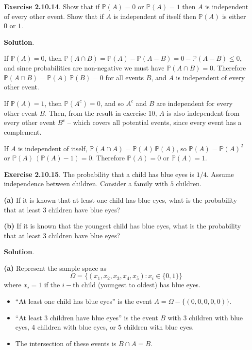 \textbf{Exercise 2.10.14}. Show that if \(\mathbb{P}(A) = 0\) or \(\mathbb{P}(A) = 1\) then \(A\) is independent of every other event. Show that if \(A\) is independent of itself then \(\mathbb{P}(A)\) is either $0$ or $1$.

\textbf{Solution}.

If \(\mathbb{P}(A) = 0\), then \(\mathbb{P}(A \cap B) = \mathbb{P}(A) - \mathbb{P}(A - B) = 0 -\mathbb{P}(A - B) \leq 0\), and since probabilities are non-negative we must have \(\mathbb{P}(A \cap B) = 0\). Therefore \(\mathbb{P}(A \cap B) = \mathbb{P}(A) \, \mathbb{P}(B) = 0\) for all events \(B\), and \(A\) is independent of every other event.

If \(\mathbb{P}(A) = 1\), then \(\mathbb{P}(A^{c}) = 0\), and so \(A^{c}\) and \(B\) are independent for every other event \(B\). Then, from the result in exercise 10, \(A\) is also independent from every other event \(B^{c}\) -- which covers all potential events, since every event has a complement.

If \(A\) is independent of itself, \(\mathbb{P}(A \cap A) = \mathbb{P}(A) \, \mathbb{P}(A)\), so \(\mathbb{P}(A) = \mathbb{P}(A)^{2}\) or \(\mathbb{P}(A) \, ( \mathbb{P}(A) - 1 ) = 0\). Therefore \(\mathbb{P}(A) = 0\) or \(\mathbb{P}(A) = 1\).

\textbf{Exercise 2.10.15}. The probability that a child has blue eyes is $1/4$. Assume independence between children. Consider a family with $5$ children.

\textbf{(a)} If it is known that at least one child has blue eyes, what is the probability that at least $3$ children have blue eyes?

\textbf{(b)} If it is known that the youngest child has blue eyes, what is the probability that at least $3$ children have blue eyes?

\textbf{Solution}.

\textbf{(a)} Represent the sample space as
\[ 
\Omega = \{ (x_{1}, x_{2}, x_{3}, x_{4}, x_{5}) : x_{i} \in \{ 0, 1 \} \} 
\]
where \(x_{i} = 1\) if the \(i-\)th child (youngest to oldest) has blue
eyes.

\begin{itemize}[tightlist]
\item
  ``At least one child has blue eyes'' is the event
  \(A = \Omega - \{ (0, 0, 0, 0, 0) \}\).
\item
  ``At least 3 children have blue eyes'' is the event \(B\) with 3
  children with blue eyes, 4 children with blue eyes, or 5 children with
  blue eyes.
\item
  The intersection of these events is \(B \cap A = B\).
\end{itemize}

